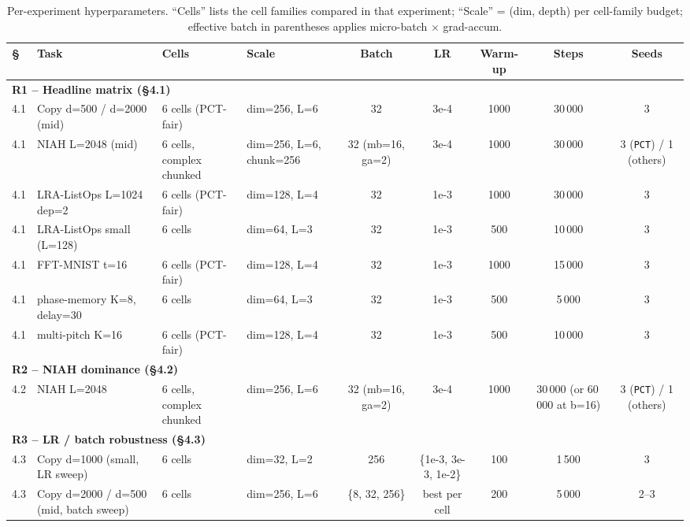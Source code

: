 \documentclass[11pt,a4paper]{article}
\theoremstyle{plain}
\theoremstyle{definition}
\begin{document}
\begin{table}[H]
\centering
\caption*{Per-experiment hyperparameters. ``Cells'' lists the cell families compared in that experiment; ``Scale'' = (dim, depth) per cell-family budget; effective batch in parentheses applies micro-batch $\times$ grad-accum.}
\label{tab:hp_by_exp}
\scriptsize
\setlength{\tabcolsep}{2.5pt}
\renewcommand{\arraystretch}{1.1}
\begin{adjustbox}{max width=\textwidth}
\begin{tabular}{|l|p{2.6cm}|p{2.0cm}|p{2.2cm}|c|c|c|c|c|}
\hline
\S\ & Task & Cells & Scale & Batch & LR & Warm-up & Steps & Seeds \\
\hline
\multicolumn{9}{|l|}{\textbf{R1 -- Headline matrix (\S 4.1)}} \\
\hline
4.1 & Copy d=500 / d=2000 (mid) & 6 cells (PCT-fair) & dim=256, L=6 & 32 & 3e-4 & 1000 & 30\,000 & 3 \\
\hline
4.1 & NIAH L=2048 (mid) & 6 cells, complex chunked & dim=256, L=6, chunk=256 & 32 (mb=16, ga=2) & 3e-4 & 1000 & 30\,000 & 3 (\texttt{PCT}) / 1 (others) \\
\hline
4.1 & LRA-ListOps L=1024 dep=2 & 6 cells (PCT-fair) & dim=128, L=4 & 32 & 1e-3 & 1000 & 30\,000 & 3 \\
\hline
4.1 & LRA-ListOps small (L=128) & 6 cells & dim=64, L=3 & 32 & 1e-3 & 500 & 10\,000 & 3 \\
\hline
4.1 & FFT-MNIST t=16 & 6 cells (PCT-fair) & dim=128, L=4 & 32 & 1e-3 & 1000 & 15\,000 & 3 \\
\hline
4.1 & phase-memory K=8, delay=30 & 6 cells & dim=64, L=3 & 32 & 1e-3 & 500 & 5\,000 & 3 \\
\hline
4.1 & multi-pitch K=16 & 6 cells (PCT-fair) & dim=128, L=4 & 32 & 1e-3 & 500 & 10\,000 & 3 \\
\hline
\multicolumn{9}{|l|}{\textbf{R2 -- NIAH dominance (\S 4.2)}} \\
\hline
4.2 & NIAH L=2048 & 6 cells, complex chunked & dim=256, L=6 & 32 (mb=16, ga=2) & 3e-4 & 1000 & 30\,000 (or 60\,000 at b=16) & 3 (\texttt{PCT}) / 1 (others) \\
\hline
\multicolumn{9}{|l|}{\textbf{R3 -- LR / batch robustness (\S 4.3)}} \\
\hline
4.3 & Copy d=1000 (small, LR sweep) & 6 cells & dim=32, L=2 & 256 & \{1e-3, 3e-3, 1e-2\} & 100 & 1\,500 & 3 \\
\hline
4.3 & Copy d=2000 / d=500 (mid, batch sweep) & 6 cells & dim=256, L=6 & \{8, 32, 256\} & best per cell & 200 & 5\,000 & 2--3 \\

\end{tabular}
\end{adjustbox}
\end{table}
\end{document}
